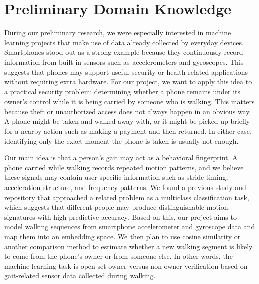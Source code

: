 \section{Preliminary Domain Knowledge}

During our preliminary research, we were especially interested in machine learning projects that make use of data already collected by everyday devices. Smartphones stood out as a strong example because they continuously record information from built-in sensors such as accelerometers and gyroscopes. This suggests that phones may support useful security or health-related applications without requiring extra hardware. For our project, we want to apply this idea to a practical security problem: determining whether a phone remains under its owner's control while it is being carried by someone who is walking. This matters because theft or unauthorized access does not always happen in an obvious way. A phone might be taken and walked away with, or it might be picked up briefly for a nearby action such as making a payment and then returned. In either case, identifying only the exact moment the phone is taken is usually not enough.

Our main idea is that a person's gait may act as a behavioral fingerprint. A phone carried while walking records repeated motion patterns, and we believe these signals may contain user-specific information such as stride timing, acceleration structure, and frequency patterns. We found a previous study and repository that approached a related problem as a multiclass classification task, which suggests that different people may produce distinguishable motion signatures with high predictive accuracy. Based on this, our project aims to model walking sequences from smartphone accelerometer and gyroscope data and map them into an embedding space. We then plan to use cosine similarity or another comparison method to estimate whether a new walking segment is likely to come from the phone's owner or from someone else. In other words, the machine learning task is open-set owner-versus-non-owner verification based on gait-related sensor data collected during walking.